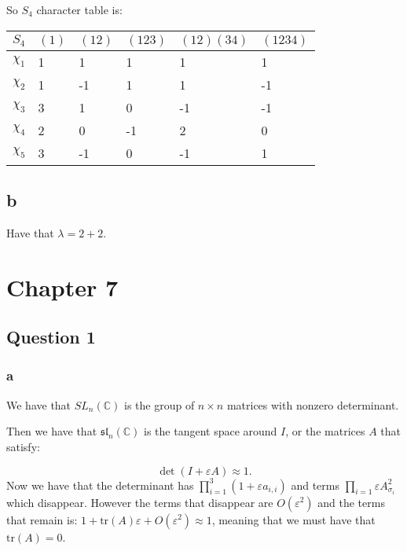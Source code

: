 \documentclass[]{article}
\newcommand{\tr}{\text{tr}}
\begin{document}
So $S_4$ character table is:
\begin{table}[h!]
	\centering
	\begin{tabular}{|l|l|l|l|l|l|}
		\hline
		$S_4$    & $(1)$ & $(12)$ & $(123)$ & $(12)(34)$ & $(1234)$ \\ \hline
		$\chi_1$ & 1     & 1      & 1       & 1          & 1        \\ \hline
		$\chi_2$ & 1     & -1     & 1       & 1          & -1       \\ \hline
		$\chi_3$ & 3     & 1      & 0       & -1         & -1       \\ \hline
		$\chi_4$ & 2     & 0      & -1      & 2          & 0        \\ \hline
		$\chi_5$ & 3     & -1     & 0       & -1         & 1        \\ \hline
	\end{tabular}
\end{table}

\subsection*{b}
Have that $\lambda = 2 + 2$. 

\section*{Chapter 7}
\subsection*{Question 1}

\subsubsection*{a}
We have that $SL_n(\mathbb{C})$ is the group of $n \times n$ matrices with nonzero determinant. 

Then we have that $\mathfrak{sl}_n(\mathbb{C})$ is the tangent space around $I$, or the matrices $A$ that satisfy:

\begin{equation}
	\det \left(I + \varepsilon A\right) \approx 1.
\end{equation}
Now we have that the determinant has $\prod_{i = 1}^3 ( 1 + \varepsilon a_{i,i})$ and terms $\prod_{i = 1} \varepsilon A_{\sigma_i}^2$ which disappear. However the terms that disappear are $O(\varepsilon^2)$ and the terms that remain is: $1 + \tr(A) \varepsilon + O(\varepsilon^2) \approx 1$, meaning that we must have that $\tr(A) = 0$. 
\end{document}
